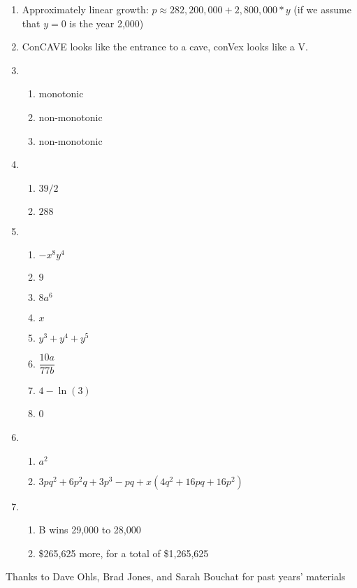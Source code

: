 \documentclass[11pt]{article}
\begin{document}
\begin{enumerate}
\item Approximately linear growth: $p \approx 282,200,000 + 2,800,000*y$ (if we assume that $y = 0$ is the year 2,000)




\item ConCAVE looks like the entrance to a cave, conVex looks like a V.



\item 
\begin{enumerate}
\item monotonic
\item non-monotonic
\item non-monotonic
\end{enumerate}


\item 
\begin{enumerate}
\item $39/2$
\item $288$
\end{enumerate}



\item 
\begin{enumerate}
 \item $-x^8y^4$
 \item $9$ 
 \item $8a^6$
 \item $x$
 \item $y^3 + y^4 + y^5$ 
 \item $\dfrac{10a}{77b}$
 \item $4 - \ln(3)$
 \item 0
\end{enumerate}




\item 
\begin{enumerate}
\item $a^2$
\item $3pq^2 + 6p^2 q + 3p^3 - pq + x(4q^2 + 16pq +16p^2)$
\end{enumerate}


\item 
\begin{enumerate}
\item B wins 29,000 to 28,000
\item \$265,625 more, for a total of \$1,265,625
\end{enumerate}










\end{enumerate}




\vfill
\begin{center}
\small{Thanks to Dave Ohls, Brad Jones, and Sarah Bouchat for past years' materials}
\end{center}
\end{document}
